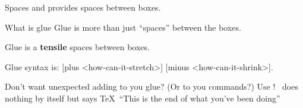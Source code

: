 \graphicspath{{sec/images/}{sec/code/s3/}}
\lstset{inputpath=sec/code/s3/}

\begin{frame}{Spaces}\relax
    {\LARGE {} and  provides spaces between boxes.}
    
\end{frame}

\cprotect{}

\begin{frame}{What is glue}\relax
    Glue is more than just ``spaces'' between the boxes.
    
    Glue is a {\bfseries \csk tensile} spaces between boxes.
    
    \inpause
    Glue syntax is: {} [{\csk plus <how-can-it-stretch>}] [{\csk minus <how-can-it-shrink>}].
     
\end{frame}

\begin{frame}{\ccol\relax}\relax
     Don't want unexpected adding to you glue? (Or to you commands?) Use \ccol\relax! \ccol\relax\ does nothing by itself but says \TeX\ ``This is the end of what you've been doing''
     
\end{frame}


